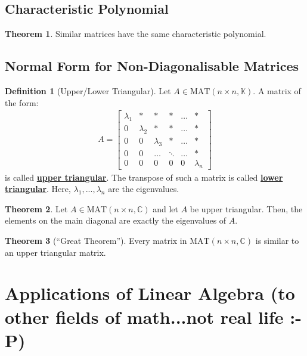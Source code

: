 \documentclass[11pt]{scrartcl}
\theoremstyle{definition}
\newtheorem{theorem}{Theorem}
\newtheorem{definition}{Definition}
\theoremstyle{remark}
\newcommand{\dfn}[1]{\textbf{\underline{#1}}}
\newcommand{\matn}[1]{\text{MAT}(n\times n, \mathbb{#1})}
\begin{document}
\subsection{Characteristic Polynomial}
\begin{theorem}
Similar matrices  have the same characteristic polynomial. 	
\end{theorem}

\subsection{Normal Form for Non-Diagonalisable Matrices}
\begin{definition}[Upper/Lower Triangular] 
	Let $A \in \matn{K}$. A matrix of the form: 
	\begin{align}
		A = \begin{bmatrix}
			\lambda_1 & * & * & * & \hdots & * \\
			0 & \lambda_2 & * & * & \hdots & * \\
			0 & 0 & \lambda_3 & * & \hdots & * \\
			0 & 0 & \hdots & \ddots & \hdots & * \\
			0 & 0 & 0 & 0 & 0 & \lambda_n 
		\end{bmatrix}	
	\end{align}
	is called \dfn{upper triangular}. The transpose of such a matrix is called \dfn{lower triangular}. Here, $\lambda_1, ..., \lambda_n$ are the eigenvalues. 
\end{definition}

\begin{theorem}
	Let $A \in \matn{C}$ and let $A$ be upper triangular. Then, the elements on the main diagonal are exactly the eigenvalues of $A$. 
\end{theorem}

\begin{theorem}[``Great Theorem''] 
	Every matrix in $\matn{C}$ is similar to an upper triangular matrix. 
\end{theorem}

\section{Applications of Linear Algebra (to other fields of math...not real life :-P)}
\end{document}
